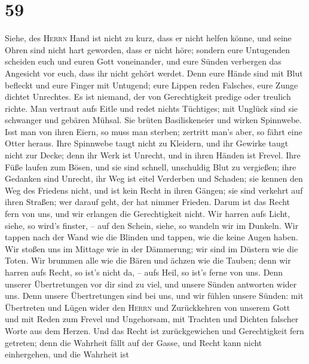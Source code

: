 \hypertarget{section-58}{%
\section{59}\label{section-58}}

 Siehe, des \textsc{Herrn} Hand ist nicht zu kurz, dass er
nicht helfen könne, und seine Ohren sind nicht hart geworden, dass er
nicht höre;  sondern eure Untugenden scheiden euch und
euren Gott voneinander, und eure Sünden verbergen das Angesicht vor
euch, dass ihr nicht gehört werdet.  Denn eure Hände sind
mit Blut befleckt und eure Finger mit Untugend; eure Lippen reden
Falsches, eure Zunge dichtet Unrechtes.  Es ist niemand,
der von Gerechtigkeit predige oder treulich richte. Man vertraut aufs
Eitle und redet nichts Tüchtiges; mit Unglück sind sie schwanger und
gebären Mühsal.  Sie brüten Basiliskeneier und wirken
Spinnwebe. Isst man von ihren Eiern, so muss man sterben; zertritt man's
aber, so fährt eine Otter heraus.  Ihre Spinnwebe taugt
nicht zu Kleidern, und ihr Gewirke taugt nicht zur Decke; denn ihr Werk
ist Unrecht, und in ihren Händen ist Frevel.  Ihre Füße
laufen zum Bösen, und sie sind schnell, unschuldig Blut zu vergießen;
ihre Gedanken sind Unrecht, ihr Weg ist eitel Verderben und Schaden;
 sie kennen den Weg des Friedens nicht, und ist kein Recht
in ihren Gängen; sie sind verkehrt auf ihren Straßen; wer darauf geht,
der hat nimmer Frieden.  Darum ist das Recht fern von uns,
und wir erlangen die Gerechtigkeit nicht. Wir harren aufs Licht, siehe,
so wird's finster, -- auf den Schein, siehe, so wandeln wir im Dunkeln.
 Wir tappen nach der Wand wie die Blinden und tappen, wie
die keine Augen haben. Wir stoßen uns im Mittage wie in der Dämmerung;
wir sind im Düstern wie die Toten.  Wir brummen alle wie
die Bären und ächzen wie die Tauben; denn wir harren aufs Recht, so
ist's nicht da, -- aufs Heil, so ist's ferne von uns. 
Denn unserer Übertretungen vor dir sind zu viel, und unsere Sünden
antworten wider uns. Denn unsere Übertretungen sind bei uns, und wir
fühlen unsere Sünden:  mit Übertreten und Lügen wider den
\textsc{Herrn} und Zurückkehren von unserem Gott und mit Reden zum
Frevel und Ungehorsam, mit Trachten und Dichten falscher Worte aus dem
Herzen.  Und das Recht ist zurückgewichen und
Gerechtigkeit fern getreten; denn die Wahrheit fällt auf der Gasse, und
Recht kann nicht einhergehen,  und die Wahrheit ist
